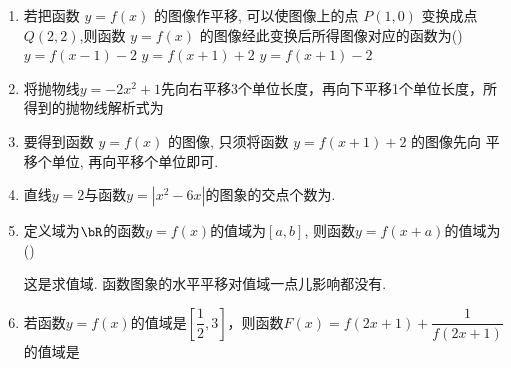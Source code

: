 \begin{enumerate}
    \item 若把函数 $y=f(x)$ 的图像作平移, 可以使图像上的点 $P(1,0)$ 变换成点 $Q(2,2)$,则函数 $y=f(x)$ 的图像经此变换后所得图像对应的函数为\dotfill()
    {$y=f(x-1)-2$}
    {$y=f(x+1)+2$}
    {$y=f(x+1)-2$}
    \item 将抛物线$y = -2x^2+1$先向右平移3个单位长度，再向下平移1个单位长度，所得到的抛物线解析式为
    \item 要得到函数 $y=f(x)$ 的图像, 只须将函数 $y=f(x+1)+2$ 的图像先向 平移个单位, 再向平移个单位即可.
    \item 直线$y = 2$与函数$y = |x^2-6x|$的图象的交点个数为.
    
    \item 定义域为$\bR$的函数$y=f(x)$的值域为$[a,b]$, 则函数$y=f(x+a)$的值域为\dotfill()
    \xx{$[2a,a+b]$}{$[a,b]$}{$[0,b-a]$}{$[-a,a+b]$}
    \begin{jieda}
    这是求值域. 函数图象的水平平移对值域一点儿影响都没有.
    \end{jieda}

    \item 若函数$y = f(x)$的值域是$\left[\dfrac{1}{2}, 3\right]$，则函数$F(x) = f(2x+1) + \dfrac{1}{f(2x+1)}$的值域是\blkda{$[2, \dfrac{10}{3}]$}
    

\end{enumerate}
